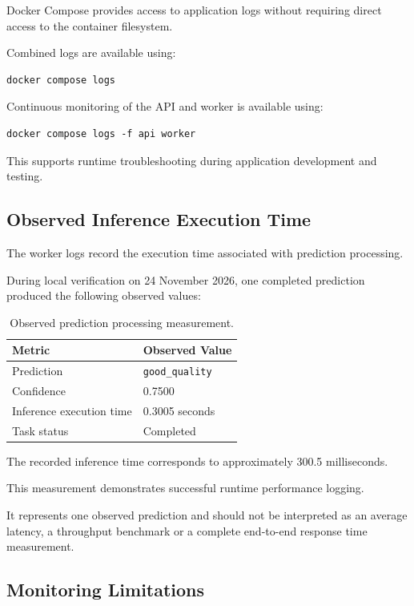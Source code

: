 \documentclass[11pt,a4paper]{article}
\begin{document}
Docker Compose provides access to application logs
without requiring direct access to the container
filesystem.

Combined logs are available using:

\begin{lstlisting}
docker compose logs
\end{lstlisting}

Continuous monitoring of the API and worker is
available using:

\begin{lstlisting}
docker compose logs -f api worker
\end{lstlisting}

This supports runtime troubleshooting during
application development and testing.

\subsection{Observed Inference Execution Time}

The worker logs record the execution time associated
with prediction processing.

During local verification on 24 November 2026,
one completed prediction produced the following
observed values:

\begin{table}[H]
\centering
\begin{tabularx}{\linewidth}{@{}lX@{}}
\toprule
\textbf{Metric} & \textbf{Observed Value}\\
\midrule
Prediction & \texttt{good\_quality}\\
Confidence & 0.7500\\
Inference execution time & 0.3005 seconds\\
Task status & Completed\\
\bottomrule
\end{tabularx}
\caption{Observed prediction processing measurement.}
\end{table}

The recorded inference time corresponds to
approximately 300.5 milliseconds.

This measurement demonstrates successful runtime
performance logging.

It represents one observed prediction and should
not be interpreted as an average latency, a
throughput benchmark or a complete end-to-end
response time measurement.

\subsection{Monitoring Limitations}
\end{document}
